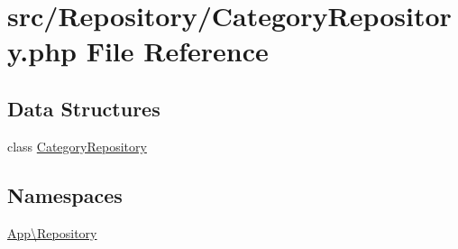 \hypertarget{_category_repository_8php}{}\section{src/\+Repository/\+Category\+Repository.php File Reference}
\label{_category_repository_8php}
\subsection*{Data Structures}
\begin{DoxyCompactItemize}
\item 
class \mbox{\hyperlink{class_app_1_1_repository_1_1_category_repository}{Category\+Repository}}
\end{DoxyCompactItemize}
\subsection*{Namespaces}
\begin{DoxyCompactItemize}
\item 
 \mbox{\hyperlink{namespace_app_1_1_repository}{App\textbackslash{}\+Repository}}
\end{DoxyCompactItemize}
